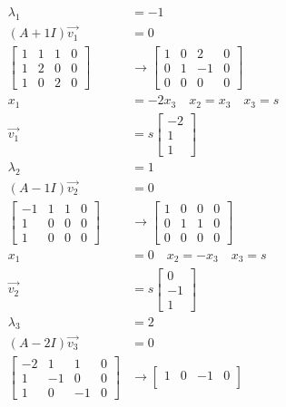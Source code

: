 \documentclass{math}
\begin{document}
\begin{align*}
  \lambda_1 &= -1 \\
  (A+1I)\vec{v_1} &= 0 \\
  \begin{bmatrix}
    1 & 1 & 1 & 0\\
    1 & 2 & 0 & 0\\
    1 & 0 & 2 & 0
  \end{bmatrix} &\to \begin{bmatrix}
    1 & 0 & 2 & 0 \\
    0 & 1 & -1 & 0 \\
    0 & 0 & 0 & 0
  \end{bmatrix} \\
  x_1 &= -2x_3 \quad x_2 = x_3 \quad x_3 = s \\
  \vec{v_1} &= s\begin{bmatrix}-2 \\ 1 \\ 1\end{bmatrix} \\
  \lambda_2 &= 1 \\
  (A-1I)\vec{v_2} &= 0 \\
  \begin{bmatrix}
    -1 & 1 & 1 & 0 \\
    1 & 0 & 0 & 0 \\
    1 & 0 & 0 & 0
  \end{bmatrix} &\to \begin{bmatrix}
    1 & 0 & 0 & 0 \\
    0 & 1 & 1 & 0 \\
    0 & 0 & 0 & 0
  \end{bmatrix} \\
  x_1 &= 0 \quad x_2 = -x_3 \quad x_3 = s \\
  \vec{v_2} &= s\begin{bmatrix}0 \\ -1 \\ 1\end{bmatrix} \\
  \lambda_3 &= 2 \\
  (A-2I)\vec{v_3} &= 0 \\
  \begin{bmatrix}
    -2 & 1 & 1 & 0 \\
    1 & -1 & 0 & 0 \\
    1 & 0 & -1 & 0
  \end{bmatrix} &\to \begin{bmatrix}
    1 & 0 & -1 & 0 \\

\end{bmatrix}
\end{align*}
\end{document}
